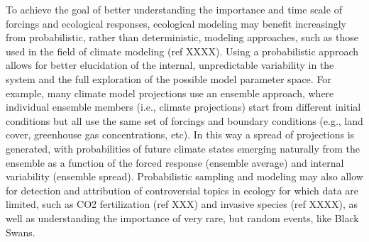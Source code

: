 \documentclass[11pt,a4paper,oneside]{article}
\begin{document}
\indent To achieve the goal of better understanding the importance and time scale of forcings and ecological responses, ecological modeling may benefit increasingly from probabilistic, rather than deterministic, modeling approaches, such as those used in the field of climate modeling (ref XXXX). Using a probabilistic approach allows for better elucidation of the internal, unpredictable variability in the system and the full exploration of the possible model parameter space. For example, many climate model projections use an ensemble approach, where individual ensemble members (i.e., climate projections) start from different initial conditions but all use the same set of forcings and boundary conditions (e.g., land cover, greenhouse gas concentrations, etc). In this way a spread of projections is generated, with probabilities of future climate states emerging naturally from the ensemble as a function of the forced response (ensemble average) and internal variability (ensemble spread). Probabilistic sampling and modeling may also allow for detection and attribution of controversial topics in ecology for which data are limited, such as CO2 fertilization (ref XXX) and invasive species (ref XXXX), as well as understanding the importance of very rare, but random events, like Black Swans.


\begin{footnotesize}
{\def\section*#1{}

}
\end{footnotesize}
\end{document}
